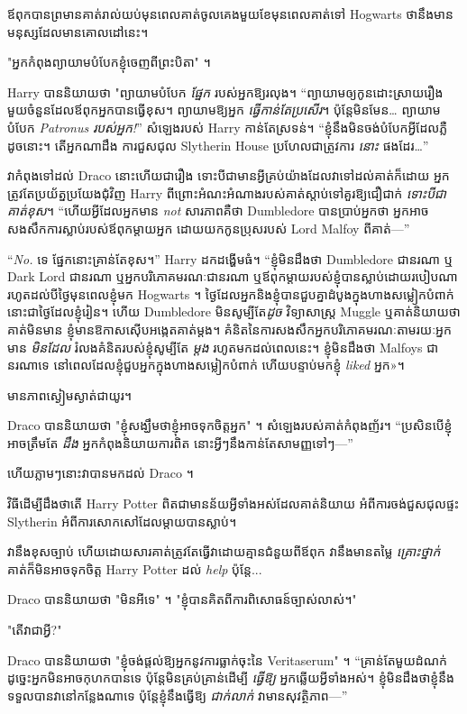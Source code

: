 {{{{{{{ឪពុកបានព្រមានគាត់រាល់យប់មុនពេលគាត់ចូលគេងមួយខែមុនពេលគាត់ទៅ Hogwarts ថានឹងមានមនុស្សដែលមានគោលដៅនេះ។

"អ្នកកំពុងព្យាយាមបំបែកខ្ញុំចេញពីព្រះបិតា" ។

Harry បាននិយាយថា "ព្យាយាមបំបែក \emph{ផ្នែក} របស់អ្នកឱ្យរលុង។ “ព្យាយាម​ឲ្យ​កូន​ដោះស្រាយ​រឿង​មួយ​ចំនួន​ដែល​ឪពុក​អ្នក​បាន​ធ្វើ​ខុស។ ព្យាយាមឱ្យអ្នក \emph{ធ្វើកាន់តែប្រសើរ}។ ប៉ុន្តែមិនមែន… ព្យាយាមបំបែក \emph{Patronus របស់អ្នក!}” សំឡេងរបស់ Harry កាន់តែស្រទន់។ “ខ្ញុំ​នឹង​មិន​ចង់​បំបែក​អ្វី​ដែល​ភ្លឺ​ដូច​នោះ​។ តើអ្នកណាដឹង ការជួសជុល Slytherin House ប្រហែលជាត្រូវការ \emph{នោះ} ផងដែរ…”

វាកំពុងទៅដល់ Draco នោះហើយជារឿង ទោះបីជាមានអ្វីគ្រប់យ៉ាងដែលវាទៅដល់គាត់ក៏ដោយ អ្នកត្រូវតែប្រយ័ត្នប្រយែងជុំវិញ Harry ពីព្រោះអំណះអំណាងរបស់គាត់ស្តាប់ទៅគួរឱ្យជឿជាក់ \emph{ទោះបីជាគាត់ខុស}។ “ហើយអ្វីដែលអ្នកមាន \emph{not} សារភាពគឺថា Dumbledore បានប្រាប់អ្នកថា អ្នកអាចសងសឹកការស្លាប់របស់ឪពុកម្តាយអ្នក ដោយយកកូនប្រុសរបស់ Lord Malfoy ពីគាត់—”

“\emph{No.} ទេ ផ្នែកនោះគ្រាន់តែខុស។” Harry ដកដង្ហើមធំ។ “ខ្ញុំមិនដឹងថា Dumbledore ជានរណា ឬ Dark Lord ជានរណា ឬអ្នកបរិភោគមរណៈជានរណា ឬឪពុកម្តាយរបស់ខ្ញុំបានស្លាប់ដោយរបៀបណា រហូតដល់បីថ្ងៃមុនពេលខ្ញុំមក Hogwarts ។ ថ្ងៃ​ដែល​អ្នក​និង​ខ្ញុំ​បាន​ជួប​គ្នា​ដំបូង​ក្នុង​ហាង​សម្លៀក​បំពាក់ នោះ​ជា​ថ្ងៃ​ដែល​ខ្ញុំ​រៀន។ ហើយ Dumbledore មិនសូម្បីតែ\emph{ដូច} វិទ្យាសាស្ត្រ Muggle ឬគាត់និយាយថាគាត់មិនមាន ខ្ញុំមានឱកាសស៊ើបអង្កេតគាត់ម្តង។ គំនិតនៃការសងសឹកអ្នកបរិភោគមរណៈតាមរយៈអ្នកមាន \emph{មិនដែល} រំលងគំនិតរបស់ខ្ញុំសូម្បីតែ \emph{ម្តង} រហូតមកដល់ពេលនេះ។ ខ្ញុំ​មិន​ដឹង​ថា Malfoys ជា​នរណា​ទេ នៅ​ពេល​ដែល​ខ្ញុំ​ជួប​អ្នក​ក្នុង​ហាង​សម្លៀក​បំពាក់ ហើយ​បន្ទាប់​មក​ខ្ញុំ \emph{liked} អ្នក»។

មានភាពស្ងៀមស្ងាត់ជាយូរ។

Draco បាននិយាយថា "ខ្ញុំសង្ឃឹមថាខ្ញុំអាចទុកចិត្តអ្នក" ។ សំឡេងរបស់គាត់កំពុងញ័រ។ “ប្រសិនបើខ្ញុំអាចត្រឹមតែ \emph{ដឹង} អ្នកកំពុងនិយាយការពិត នោះអ្វីៗនឹងកាន់តែសាមញ្ញទៅៗ—”

ហើយភ្លាមៗនោះវាបានមកដល់ Draco ។

វិធីដើម្បីដឹងថាតើ Harry Potter ពិតជាមានន័យអ្វីទាំងអស់ដែលគាត់និយាយ អំពីការចង់ជួសជុលផ្ទះ Slytherin អំពីការសោកសៅដែលម្តាយបានស្លាប់។

វានឹងខុសច្បាប់ ហើយដោយសារគាត់ត្រូវតែធ្វើវាដោយគ្មានជំនួយពីឪពុក វានឹងមានតម្លៃ \emph{គ្រោះថ្នាក់} គាត់ក៏មិនអាចទុកចិត្ត Harry Potter ដល់ \emph{help} ប៉ុន្តែ...

Draco បាននិយាយថា "មិនអីទេ" ។ "ខ្ញុំបានគិតពីការពិសោធន៍ច្បាស់លាស់។"

"តើវាជាអ្វី?"

Draco បាននិយាយថា "ខ្ញុំចង់ផ្តល់ឱ្យអ្នកនូវការធ្លាក់ចុះនៃ Veritaserum" ។ “គ្រាន់តែមួយដំណក់ ដូច្នេះអ្នកមិនអាចកុហកបានទេ ប៉ុន្តែមិនគ្រប់គ្រាន់ដើម្បី \emph{ធ្វើឱ្យ} អ្នកឆ្លើយអ្វីទាំងអស់។ ខ្ញុំ​មិន​ដឹង​ថា​ខ្ញុំ​នឹង​ទទួល​បាន​វា​នៅ​កន្លែង​ណា​ទេ ប៉ុន្តែ​ខ្ញុំ​នឹង​ធ្វើ​ឱ្យ \emph{ជាក់លាក់} វា​មាន​សុវត្ថិភាព—”

}}}}}}}
